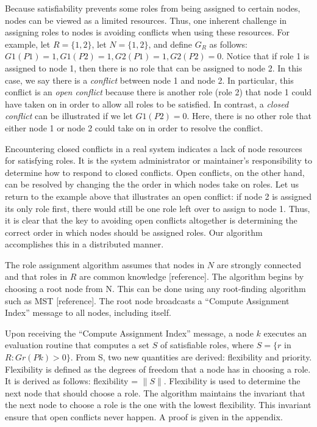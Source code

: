 \documentclass[11pt]{article}
\begin{document}
\begin{multicols}{2}
Because satisfiability prevents some roles from being assigned to certain nodes, nodes can be viewed as a limited resources. Thus, one inherent challenge in assigning roles to nodes is avoiding conflicts when using these resources. For example, let $R = \{1, 2\}$, let $N = \{1, 2\}$, and define $G_{R}$ as follows: $G1(P1) = 1, G1(P2) = 1, G2(P1) = 1, G2(P2) = 0$. Notice that if role 1 is assigned to node 1, then there is no role that can be assigned to node 2. In this case, we say there is a \textit{conflict} between node 1 and node 2. In particular, this conflict is an \textit{open conflict} because there is another role (role 2) that node 1 could have taken on in order to allow all roles to be satisfied. In contrast, a \textit{closed conflict} can be illustrated if we let $G1(P2) = 0$. Here, there is no other role that either node 1 or node 2 could take on in order to resolve the conflict.

Encountering closed conflicts in a real system indicates a lack of node resources for satisfying roles. It is the system administrator or maintainer's responsibility to determine how to respond to closed conflicts. Open conflicts, on the other hand, can be resolved by changing the the order in which nodes take on roles. Let us return to the example above that illustrates an open conflict: if node 2 is assigned its only role first, there would still be one role left over to assign to node 1. Thus, it is clear that the key to avoiding open conflicts altogether is determining the correct order in which nodes should be assigned roles. Our algorithm accomplishes this in a distributed manner.

The role assignment algorithm assumes that nodes in $N$ are strongly connected and that roles in $R$ are common knowledge [reference]. The algorithm begins by choosing a root node from N. This can be done using any root-finding algorithm such as MST [reference]. The root node broadcasts a ``Compute Assignment Index'' message to all nodes, including itself. 

Upon receiving the ``Compute Assignment Index'' message, a node $k$ executes an evaluation routine that computes a set $S$ of satisfiable roles, where $S = \{r$ in $R : Gr(Pk) > 0\}$. From S, two new quantities are derived: flexibility and priority. Flexibility is defined as the degrees of freedom that a node has in choosing a role. It is derived as follows: flexibility = $\|S\|$. Flexibility is used to determine the next node that should choose a role. The algorithm maintains the invariant that the next node to choose a role is the one with the lowest flexibility. This invariant ensure that open conflicts never happen. A proof is given in the appendix.


\end{multicols}
\end{document}
